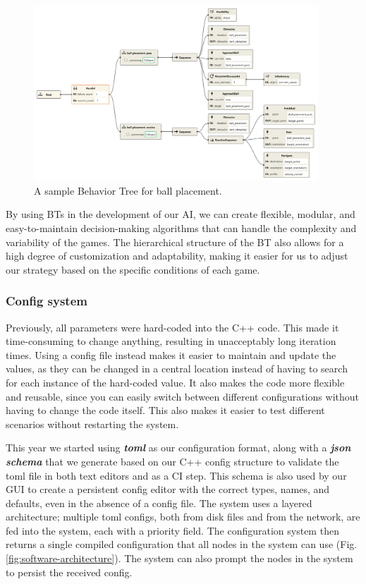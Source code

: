 \documentclass[runningheads]{llncs}
\begin{document}
\begin{figure}
	\centering
	\includegraphics[width=0.95\textwidth]{images/ball_placement_bt.png}
	\caption{A sample Behavior Tree for ball placement.}
	\label{fig:bt-move}
\end{figure}

By using BTs in the development of our AI, we can create flexible, modular, and easy-to-maintain decision-making algorithms that can handle the complexity and variability of the games. The hierarchical structure of the BT also allows for a high degree of customization and adaptability, making it easier for us to adjust our strategy based on the specific conditions of each game.

\subsubsection{Config system}
Previously, all parameters were hard-coded into the C++ code. This made it time-consuming to change anything, resulting in unacceptably long iteration times. Using a config file instead makes it easier to maintain and update the values, as they can be changed in a central location instead of having to search for each instance of the hard-coded value. It also makes the code more flexible and reusable, since you can easily switch between different configurations without having to change the code itself. This also makes it easier to test different scenarios without restarting the system.

This year we started using \textbf{\textit{toml}} \cite{ref_toml} as our configuration format, along with a \textbf{\textit{json schema}} \cite{ref_json-schema} that we generate based on our C++ config structure to validate the toml file in both text editors and as a CI step. This schema is also used by our GUI to create a persistent config editor with the correct types, names, and defaults, even in the absence of a config file. The system uses a layered architecture; multiple toml configs, both from disk files and from the network, are fed into the system, each with a priority field. The configuration system then returns a single compiled configuration that all nodes in the system can use (Fig. \ref{fig:software-architecture}). The system can also prompt the nodes in the system to persist the received config.
\end{document}
